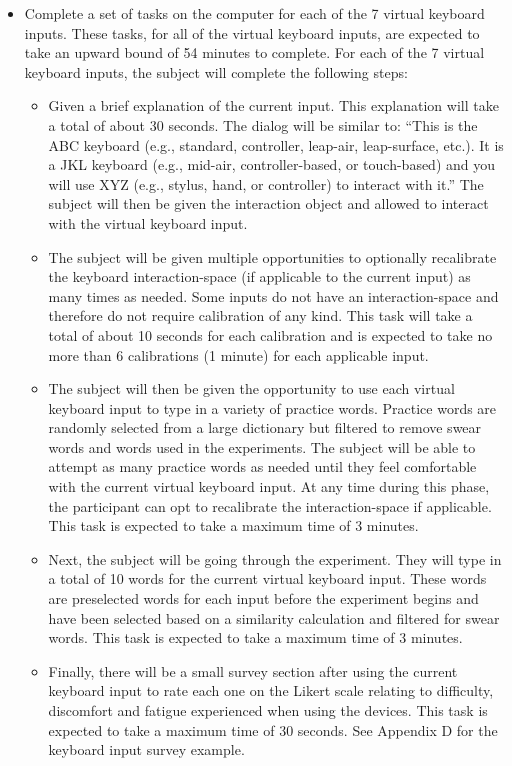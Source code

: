 \begin{itemize}
\item Complete a set of tasks on the computer for each of the 7 virtual keyboard inputs. These tasks, for all of the virtual keyboard inputs, are expected to take an upward bound of 54 minutes to complete. For each of the 7 virtual keyboard inputs, the subject will complete the following steps:
\begin{itemize}
\item Given a brief explanation of the current input. This explanation will take a total of about 30 seconds. The dialog will be similar to: “This is the ABC keyboard (e.g., standard, controller, leap-air, leap-surface, etc.). It is a JKL keyboard (e.g., mid-air, controller-based, or touch-based) and you will use XYZ (e.g., stylus, hand, or controller) to interact with it.” The subject will then be given the interaction object and allowed to interact with the virtual keyboard input.
\item The subject will be given multiple opportunities to optionally recalibrate the keyboard interaction-space (if applicable to the current input) as many times as needed. Some inputs do not have an interaction-space and therefore do not require calibration of any kind. This task will take a total of about 10 seconds for each calibration and is expected to take no more than 6 calibrations (1 minute) for each applicable input.
\item The subject will then be given the opportunity to use each virtual keyboard input to type in a variety of practice words. Practice words are randomly selected from a large dictionary but filtered to remove swear words and words used in the experiments. The subject will be able to attempt as many practice words as needed until they feel comfortable with the current virtual keyboard input. At any time during this phase, the participant can opt to recalibrate the interaction-space if applicable. This task is expected to take a maximum time of 3 minutes.
\item Next, the subject will be going through the experiment. They will type in a total of 10 words for the current virtual keyboard input. These words are preselected words for each input before the experiment begins and have been selected based on a similarity calculation and filtered for swear words. This task is expected to take a maximum time of 3 minutes.
\item Finally, there will be a small survey section after using the current keyboard input to rate each one on the Likert scale relating to difficulty, discomfort and fatigue experienced when using the devices. This task is expected to take a maximum time of 30 seconds. See Appendix D for the keyboard input survey example.

\end{itemize}
\end{itemize}
